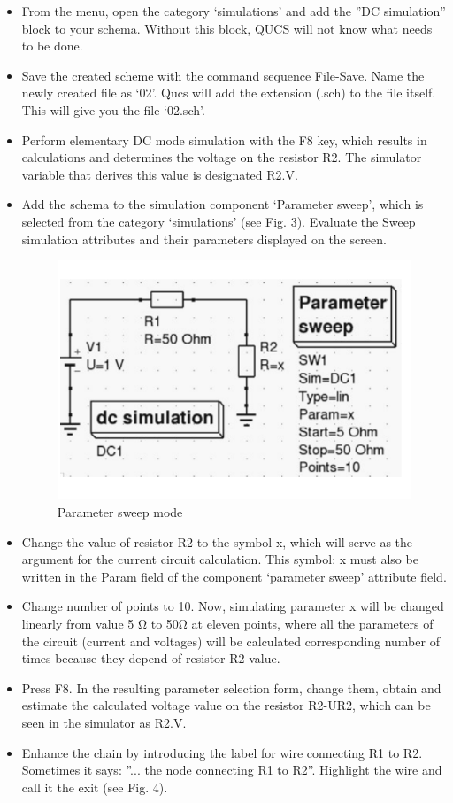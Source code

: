 \documentclass{report}
\begin{document}
\begin{itemize}
\item From the menu, open the category ‘simulations’ and add the ”DC simulation” block to
your schema. Without this block, QUCS will not know what needs to be done.
\item Save the created scheme with the command sequence File-Save. Name the newly created
file as ‘02’. Qucs will add the extension (.sch) to the file itself. This will give you the
file ‘02.sch’.

\item Perform elementary DC mode simulation with the F8 key, which results in calculations
and determines the voltage on the resistor R2. The simulator variable that derives this
value is designated R2.V.
\item Add the schema to the simulation component ‘Parameter sweep’, which is selected from
the category ‘simulations’ (see Fig. 3). Evaluate the Sweep simulation attributes and
their parameters displayed on the screen. \cite{sharelatex,thirdRef}


\begin{figure}[t]
\includegraphics{Figures/Figu}
\caption{Parameter sweep mode}
\label{fig:figure3}
\end{figure}


\item Change the value of resistor R2 to the symbol x, which will serve as the argument for the
current circuit calculation. This symbol: x must also be written in the Param field of the
component ‘parameter sweep’ attribute field.
\item Change number of points to 10. Now, simulating parameter x will be changed linearly
from value 5 Ω to 50Ω at eleven points, where all the parameters of the circuit (current
and voltages) will be calculated corresponding number of times because they depend of
resistor R2 value.
\item Press F8. In the resulting parameter selection form, change them, obtain and estimate
the calculated voltage value on the resistor R2-UR2, which can be seen in the simulator
as R2.V.
\item Enhance the chain by introducing the label for wire connecting R1 to R2. Sometimes it
says: ”... the node connecting R1 to R2”. Highlight the wire and call it the exit (see Fig. 4). \cite{sharelatex}


\end{itemize}
\end{document}
